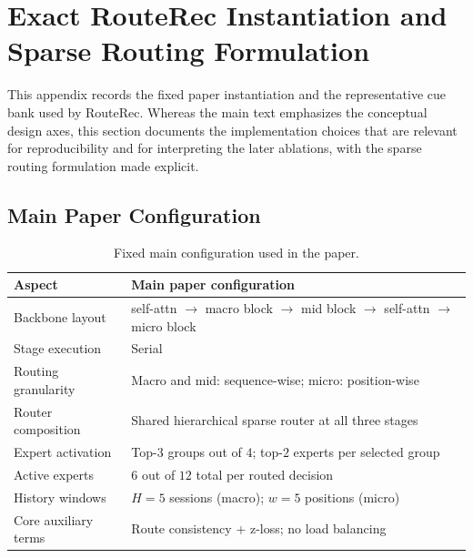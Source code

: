 \documentclass[sigconf,review,anonymous]{acmart}
\begin{document}
\clearpage
\balance



\clearpage
\appendix

\section{Exact RouteRec Instantiation and Sparse Routing Formulation}
\label{app:method-details}
This appendix records the fixed paper instantiation and the representative cue bank used by RouteRec. Whereas the main text emphasizes the conceptual design axes, this section documents the implementation choices that are relevant for reproducibility and for interpreting the later ablations, with the sparse routing formulation made explicit.

\subsection{Main Paper Configuration}

\begin{table}[H]
  \centering
  \caption{Fixed main configuration used in the paper.}
  \label{tab:appendix-main-setting}
  \footnotesize
  \setlength{\tabcolsep}{4pt}
  \renewcommand{\arraystretch}{1.07}
  \begin{tabularx}{\columnwidth}{@{}L{0.30\columnwidth}>{\raggedright\arraybackslash}X@{}}
    \toprule
    Aspect & Main paper configuration \\
    \midrule
    Backbone layout & self-attn $\to$ macro block $\to$ mid block $\to$ self-attn $\to$ micro block \\
    Stage execution & Serial \\
    Routing granularity & Macro and mid: sequence-wise; micro: position-wise \\
    Router composition & Shared hierarchical sparse router at all three stages \\
    Expert activation & Top-$3$ groups out of $4$; top-$2$ experts per selected group \\
    Active experts & $6$ out of $12$ total per routed decision \\
    History windows & $H=5$ sessions (macro); $w=5$ positions (micro) \\
    Core auxiliary terms & Route consistency + z-loss; no load balancing \\
    \bottomrule
  \end{tabularx}
\end{table}
\end{document}
